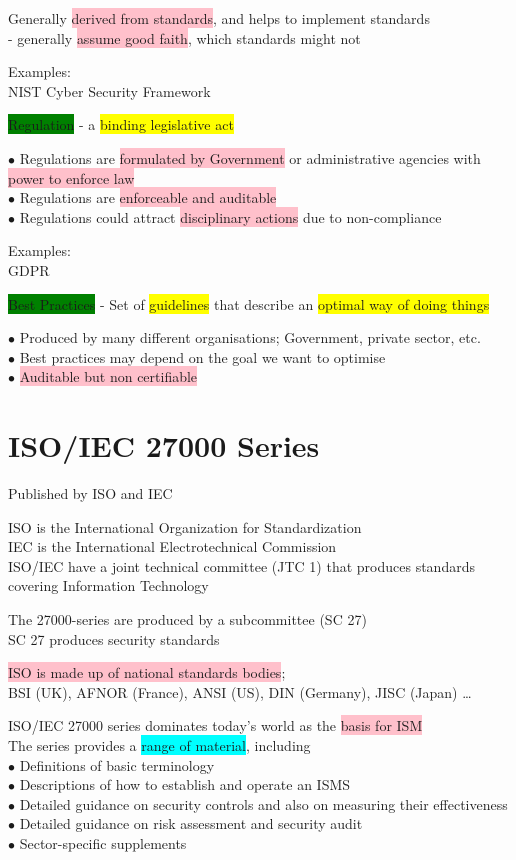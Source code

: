 \documentclass[tikz,border=10pt]{project_plan}
\newcommand{\bulletPoint}{\hspace{-3.1pt}$\bullet$ \hspace{5pt}}
\begin{document}
Generally \colorbox{pink}{derived from standards}, and helps to implement standards\\
- generally \colorbox{pink}{assume good faith}, which standards might not

Examples:\\
NIST Cyber Security Framework

\colorbox{green}{Regulation} - a \colorbox{yellow}{binding legislative act}

\bulletPoint Regulations are \colorbox{pink}{formulated by Government} or administrative agencies with \colorbox{pink}{power to enforce law}\\
\bulletPoint Regulations are \colorbox{pink}{enforceable and auditable}\\
\bulletPoint Regulations could attract \colorbox{pink}{disciplinary actions} due to non-compliance

Examples:\\
GDPR

\colorbox{green}{Best Practices} - Set of \colorbox{yellow}{guidelines} that describe an \colorbox{yellow}{optimal way of doing things}

\bulletPoint Produced by many different organisations; Government, private sector, etc.\\
\bulletPoint Best practices may depend on the goal we want to optimise\\
\bulletPoint \colorbox{pink}{Auditable but non certifiable}

\section{ISO/IEC 27000 Series}
Published by ISO and IEC

ISO is the International Organization for Standardization\\
IEC is the International Electrotechnical Commission\\

ISO/IEC have a joint technical committee (JTC 1) that produces standards covering Information Technology

The 27000-series are produced by a subcommittee (SC 27)\\
SC 27 produces security standards

\colorbox{pink}{ISO is made up of national standards bodies};\\
BSI (UK), AFNOR (France), ANSI (US), DIN (Germany), JISC (Japan) …

ISO/IEC 27000 series dominates today’s world as the \colorbox{pink}{basis for ISM}\\
The series provides a \colorbox{cyan}{range of material}, including\\
\bulletPoint Definitions of basic terminology\\
\bulletPoint Descriptions of how to establish and operate an ISMS\\
\bulletPoint Detailed guidance on security controls and also on measuring their effectiveness\\
\bulletPoint Detailed guidance on risk assessment and security audit\\
\bulletPoint Sector-specific supplements
\end{document}
